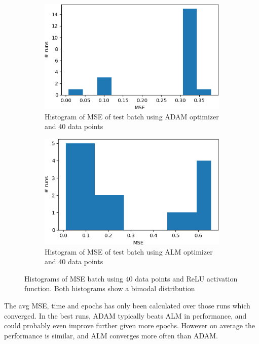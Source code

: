 \begin{figure}
     \centering
     \begin{subfigure}[b]{0.49\textwidth}
         \centering
         \includegraphics[width=\textwidth]{hist}
         \caption{Histogram of MSE of test batch using ADAM optimizer and 40 data points}
         \label{adamhist}
     \end{subfigure}
     \begin{subfigure}[b]{0.49\textwidth}
         \centering
         \includegraphics[width=\textwidth]{almhist}
         \caption{Histogram of MSE of test batch using ALM optimizer and 40 data points}
         \label{almhist}
     \end{subfigure}
     \caption{Histograms of MSE batch using 40 data points and ReLU activation function. Both histograms show a bimodal distribution}
     \label{hist}
\end{figure}


The avg MSE, time and epochs has only been calculated over those runs which converged. In the best runs, ADAM typically beats ALM in performance, and could probably even improve further given more epochs. However on average the performance is similar, and ALM converges more often than ADAM. 

